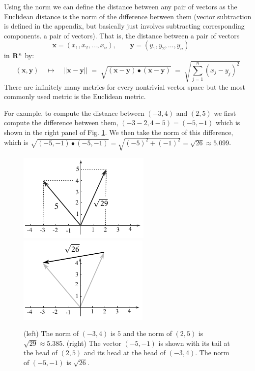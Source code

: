 Using the norm we can define the distance between any pair of vectors as the Euclidean distance is the norm of the difference between them (vector subtraction is defined in the appendix, but basically just involves subtracting corresponding components. 
 a pair of vectors). That is, the distance between a pair of vectors
\begin{equation*}
\mathbf{x} = (x_1, x_2, \ldots, x_n), \qquad
\mathbf{y} = (y_1, y_2, \ldots, y_n) \qquad
\end{equation*}
in ${\bf R}^n$ by:
\begin{equation*}
\left(\mathbf{x}, \mathbf{y}\right) \quad \mapsto \quad
|| \mathbf{x} - \mathbf{y} || \; = \; 
\sqrt{ (\mathbf{x} - \mathbf{y}) \bullet (\mathbf{x} - \mathbf{y}) }
\; = \;  \sqrt{ \sum_{j=1}^n (x_j - y_j)^2 }
\end{equation*}
There are infinitely many metrics for every nontrivial vector space but the 
most commonly used metric is the Euclidean metric.

For example, to compute the distance between $(-3,4)$ and $(2,5)$ we first compute the difference between them, 
$(-3 -2,  4- 5) = (-5,-1)$ which is shown in the right 
panel of Fig. \ref{metricfig}. We then take the norm of this difference, which is $ \sqrt{ (-5,-1) \bullet  (-5,-1)}  = \sqrt{(-5)^2+(-1)^2} 
= \sqrt{26} \approx 5.099$.

\begin{figure}[h]
\centering
\includegraphics[scale=1.55]{./images/Norm.pdf}
\qquad
\includegraphics[scale=1.55]{./images/dist.pdf}
\caption{(left) The norm of $(-3,4)$ is $5$ and the norm of $(2,5)$ is 
$\sqrt{29} \approx 5.385$. (right) The vector $(-5,-1)$ is shown with its tail at the head 
of $(2,5)$ and its head at the head of $(-3,4)$. The norm of $(-5,-1)$ is 
$\sqrt{26}$.}
\label{metricfig}
\end{figure}


